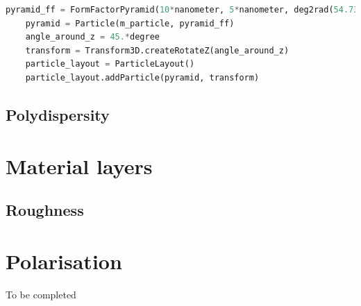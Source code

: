 \begin{lstlisting}[language=python, style=eclipseboxed,numbers=none,nolol]
    pyramid_ff = FormFactorPyramid(10*nanometer, 5*nanometer, deg2rad(54.73 ) )
    pyramid = Particle(m_particle, pyramid_ff)
    angle_around_z = 45.*degree
    transform = Transform3D.createRotateZ(angle_around_z)
    particle_layout = ParticleLayout()
    particle_layout.addParticle(pyramid, transform) 
\end{lstlisting}

\subsection{Polydispersity}

\section{Material layers}
\subsection{Roughness}
\section{Polarisation}
To be completed 
